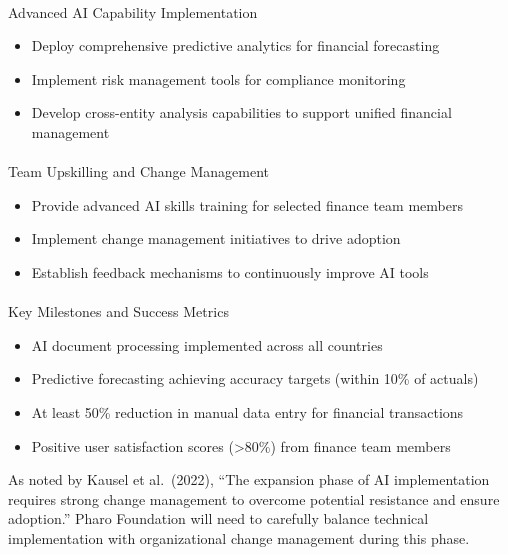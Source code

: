 \documentclass[
]{article}
\makeatletter
\let\oldparagraph\paragraph
\renewcommand{\paragraph}{
    \@ifstar
      \xxxParagraphStar
      \xxxParagraphNoStar
  }
\newcommand{\xxxParagraphStar}[1]{\oldparagraph*{#1}\mbox{}}
\newcommand{\xxxParagraphNoStar}[1]{\oldparagraph{#1}\mbox{}}
\providecommand{\tightlist}{%
  \setlength{\itemsep}{0pt}\setlength{\parskip}{0pt}}\usepackage{longtable,booktabs,array}
\makeatother
\begin{document}
\paragraph{Advanced AI Capability
Implementation}\label{advanced-ai-capability-implementation}

\begin{itemize}
\tightlist
\item
  Deploy comprehensive predictive analytics for financial forecasting
\item
  Implement risk management tools for compliance monitoring
\item
  Develop cross-entity analysis capabilities to support unified
  financial management
\end{itemize}

\paragraph{Team Upskilling and Change
Management}\label{team-upskilling-and-change-management}

\begin{itemize}
\tightlist
\item
  Provide advanced AI skills training for selected finance team members
\item
  Implement change management initiatives to drive adoption
\item
  Establish feedback mechanisms to continuously improve AI tools
\end{itemize}

\paragraph{Key Milestones and Success
Metrics}\label{key-milestones-and-success-metrics-1}

\begin{itemize}
\tightlist
\item
  AI document processing implemented across all countries
\item
  Predictive forecasting achieving accuracy targets (within 10\% of
  actuals)
\item
  At least 50\% reduction in manual data entry for financial
  transactions
\item
  Positive user satisfaction scores (\textgreater80\%) from finance team
  members
\end{itemize}

As noted by Kausel et al.~(2022), ``The expansion phase of AI
implementation requires strong change management to overcome potential
resistance and ensure adoption.'' Pharo Foundation will need to
carefully balance technical implementation with organizational change
management during this phase.
\end{document}
